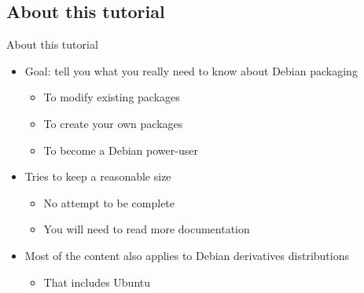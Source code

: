 \documentclass[10pt,final]{beamer}
\begin{document}
\subsection{About this tutorial}
\begin{frame}{About this tutorial}
\begin{itemize}
\item Goal: tell you what you really need to know about Debian packaging
\begin{itemize}
			\hbr
\item To modify existing packages
			\hbr
\item To create your own packages
			\hbr
\item To become a Debian power-user
\end{itemize}
\br
\item Tries to keep a reasonable size
	\begin{itemize}
			\hbr
		\item No attempt to be complete
			\hbr
		\item You will need to read more documentation
	\end{itemize}
\br
\item Most of the content also applies to Debian derivatives distributions
	\begin{itemize}
			\hbr
		\item That includes Ubuntu
	\end{itemize}
\end{itemize}
\end{frame}
\end{document}
